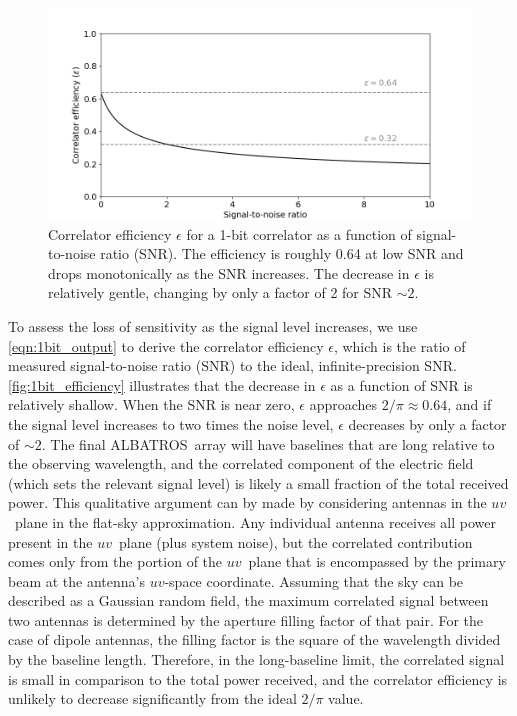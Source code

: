 \documentclass{ws-jai}
\def\albatros{ALBATROS}
\begin{document}
\begin{figure}
  \begin{center}
    \includegraphics[width=0.7\linewidth]{Figures/corr_efficiency/corr_efficiency.png}
    \caption{Correlator efficiency $\epsilon$ for a 1-bit correlator
      as a function of signal-to-noise ratio (SNR).  The efficiency is
      roughly 0.64 at low SNR and drops monotonically as the SNR
      increases.  The decrease in $\epsilon$ is relatively gentle,
      changing by only a factor of 2 for SNR $\sim2$.}
    \label{fig:1bit_efficiency}
    \end{center}
\end{figure}


To assess the loss of sensitivity as the signal level increases, we
use \autoref{eqn:1bit_output} to derive the correlator efficiency
$\epsilon$, which is the ratio of measured signal-to-noise ratio (SNR)
to the ideal, infinite-precision SNR.  \autoref{fig:1bit_efficiency}
illustrates that the decrease in $\epsilon$ as a function of SNR is
relatively shallow.  When the SNR is near zero, $\epsilon$ approaches
$2/\pi \approx 0.64$, and if the signal level increases to two times
the  
noise level, $\epsilon$ decreases by only a factor of $\sim2$.  The
final \albatros\ array will have baselines that are long relative to
the observing wavelength, and the correlated component of the electric
field (which sets the relevant signal level) is likely a small
fraction of the total received power.  This qualitative argument can
by made by considering antennas in the $uv$~plane in the flat-sky
approximation.  Any individual antenna receives all power present in
the $uv$~plane (plus system noise), but the correlated contribution
comes only from the portion of the $uv$~plane that is encompassed by
the primary beam at the antenna's $uv$-space coordinate.  Assuming
that the sky can be described as a Gaussian random field, the maximum
correlated signal between two antennas is determined by the aperture
filling factor of that pair.  For the case of dipole antennas, the
filling factor is the square of the wavelength divided by the baseline
length.  Therefore, in the long-baseline limit, the correlated signal
is small in comparison to the total power received, and the correlator
efficiency is unlikely to decrease significantly from the ideal
$2/\pi$ value.
\end{document}
